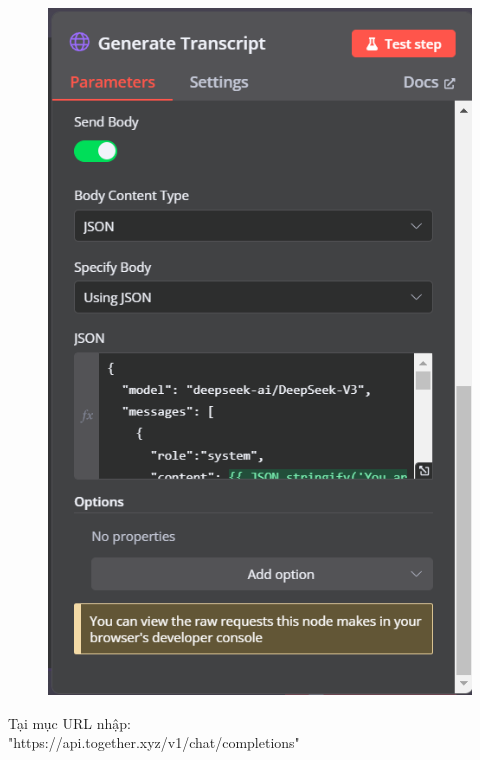 \begin{itemize}[label=]
\begin{figure}[H]
    \hspace{5pt}
    \begin{minipage}{0.45\textwidth}
         \includegraphics[width=\linewidth]{images/TogetherAI-3.png}
    \end{minipage}
\end{figure}

Tại mục URL nhập: \\
"https://api.together.xyz/v1/chat/completions"\\


\end{itemize}

